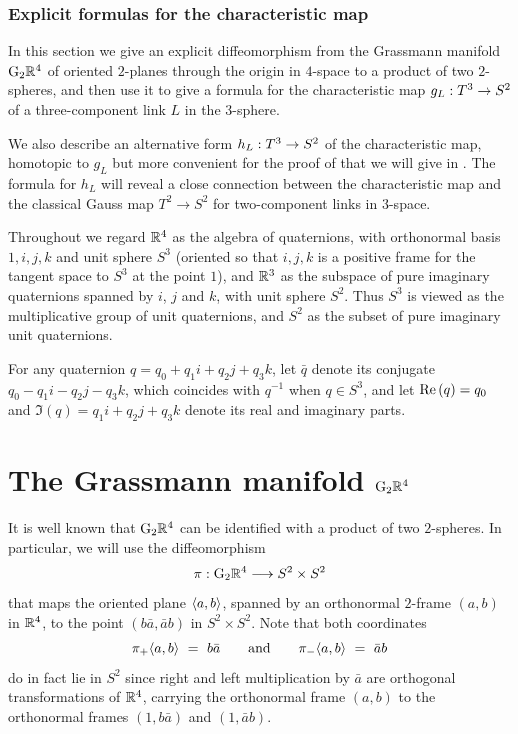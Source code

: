 
\section{Explicit formulas for the characteristic map} 
\label{sec:characteristic}

In this section we give an explicit diffeomorphism from the Grassmann manifold $\mathrm{G}_2\mathbb R^4$ of oriented $2$-planes through the origin in $4$-space to a product of two $2$-spheres, and then use it to give a formula for the characteristic map $g_L:T^3\to S^2$ of a three-component link $L$ in the $3$-sphere. 

We also describe an alternative form $h_L:T^3\to S^2$ of the characteristic map, homotopic to $g_L$ but more convenient for the proof of   that we will give in .   The formula for $h_L$ will reveal a close connection between the characteristic map and the classical Gauss map $T^2\to S^2$ for two-component links in $3$-space. 

Throughout we regard $\mathbb R^4$ as the algebra of {\itb quaternions}, with orthonormal basis $1,i,j,k$ and unit sphere $S^3$ (oriented so that $i,j,k$ is a positive frame for the tangent space to $S^3$ at the point $1$),  and $\mathbb R^3$ as the subspace of {\itb pure imaginary quaternions} spanned by $i$, $j$ and $k$, with unit sphere $S^2$.    Thus $S^3$ is viewed as the multiplicative group of unit quaternions, and $S^2$ as the subset of pure imaginary unit quaternions.  

For any quaternion $q = q_0+q_1i+q_2j+q_3k$, let $\bar q$ denote its conjugate $q_0-q_1i-q_2j-q_3k$, which coincides with $q^{-1}$ when $q\in S^3$, and let $\mathrm{Re\,}(q) = q_0$ and $\Im(q)=q_1i+q_2j+q_3k$ denote its real and imaginary parts.  


 
\part{The Grassmann manifold $\mathrm{G}_2\mathbb R^4$}

It is well known
that $\mathrm{G}_2\mathbb R^4$ can be identified with a product of two $2$-spheres.  In particular, we will use the diffeomorphism
$$
\pi: \mathrm{G}_2\mathbb R^4 \longrightarrow S^2\times S^2  
$$
that maps the oriented plane $\langle a,b\rangle$, spanned by an orthonormal $2$-frame $(a,b)$ in $\mathbb R^4$, to the point $(b\bar a,\bar ab)$ in $S^2\times S^2$.  Note that both coordinates 
$$
\pi_+\langle a,b\rangle \ = \ b\bar a \qquad\text{and}\qquad \pi_-\langle a,b\rangle \ = \ \bar ab
$$
do in fact lie in $S^2$ since right and left multiplication by $\bar a$ are orthogonal transformations of $\mathbb R^4$, carrying the orthonormal frame $(a,b)$ to the orthonormal frames $(1,b\bar a)$ and $(1,\bar ab)$.   

